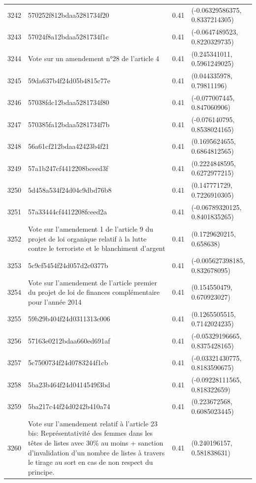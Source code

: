 \begin{table}[ht]
\begin{tabular}{rlrl}
  3242 & 570252f812bdaa5281734f20 & 0.41 & (-0.06329586375, 0.8337214305) \\ 
  3243 & 57024f8a12bdaa5281734f1c & 0.41 & (-0.0647489523, 0.8220329735) \\ 
  3244 & Vote sur un amendement n°28 de l'article 4 & 0.41 & (0.245341011, 0.5961249025) \\ 
  3245 & 59da637b4f24d05b4815c77e & 0.41 & (0.044335978, 0.79811196) \\ 
  3246 & 57038fdc12bdaa5281734f80 & 0.41 & (-0.077007445, 0.847060906) \\ 
  3247 & 570385fa12bdaa5281734f7b & 0.41 & (-0.076140795, 0.8538024165) \\ 
  3248 & 56a61cf212bdaa42423b4f21 & 0.41 & (0.1695624655, 0.6864812565) \\ 
  3249 & 57a1b247cf4412208bceed3f & 0.41 & (0.2224848595, 0.6272977215) \\ 
  3250 & 5d458a534f24d04c9dbd76b8 & 0.41 & (0.147771729, 0.7226910305) \\ 
  3251 & 57a33444cf4412208fceed2a & 0.41 & (-0.06789320125, 0.8401835265) \\ 
  3252 & Vote sur l'amendement 1 de l'article 9 du projet de loi organique relatif à la lutte contre le terroriste et le blanchiment d'argent & 0.41 & (0.1729620215, 0.658638) \\ 
  3253 & 5c9cf5454f24d057d2c0377b & 0.41 & (-0.005627398185, 0.832678095) \\ 
  3254 & Vote sur l'amendement de l'article premier du projet de loi de finances complémentaire pour l'année 2014 & 0.41 & (0.154550479, 0.670923027) \\ 
  3255 & 59b29b404f24d0311313c006 & 0.41 & (0.1265505515, 0.7142024235) \\ 
  3256 & 57163e0212bdaa660ed691af & 0.41 & (-0.05329196665, 0.8375428165) \\ 
  3257 & 5c7500734f24d0783244f1cb & 0.41 & (-0.03321430775, 0.8183590675) \\ 
  3258 & 5ba23b464f24d0414549f3bd & 0.41 & (-0.09228111565, 0.818322659) \\ 
  3259 & 5ba217c44f24d0242b410a74 & 0.41 & (0.223672568, 0.6085023445) \\ 
  3260 & Vote sur l'amendement relatif à l'article 23 bis: Représentativité des femmes dans les têtes de listes avec 30\% au moins + sanction d'invalidation d'un nombre de listes à travers le tirage au sort en cas de non respect du principe. & 0.41 & (0.240196157, 0.581838631) \\ 

\end{tabular}
\end{table}
